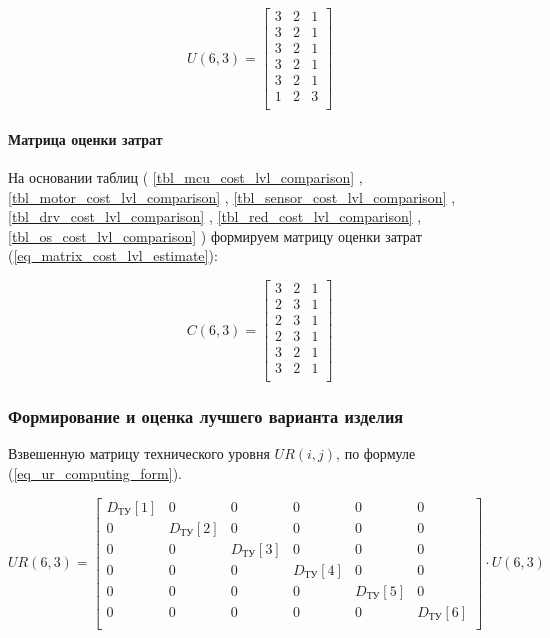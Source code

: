 \begin{equation}
    U(6,3) =
    \begin{bmatrix}
        3 & 2 & 1 \\
        3 & 2 & 1 \\
        3 & 2 & 1 \\
        3 & 2 & 1 \\
        3 & 2 & 1 \\
        1 & 2 & 3 \\
    \end{bmatrix}
    \label{eq_matrix_tech_lvl_estimate}
\end{equation}

\paragraph{Матрица оценки затрат}

На основании таблиц (
    \ref{tbl_mcu_cost_lvl_comparison}
  , \ref{tbl_motor_cost_lvl_comparison}
  , \ref{tbl_sensor_cost_lvl_comparison}
  , \ref{tbl_drv_cost_lvl_comparison}
  , \ref{tbl_red_cost_lvl_comparison}
  , \ref{tbl_os_cost_lvl_comparison}
)
формируем матрицу оценки затрат
(\ref{eq_matrix_cost_lvl_estimate}):

\begin{equation}
    C(6,3) =
    \begin{bmatrix}
        3 & 2 & 1 \\
        2 & 3 & 1 \\
        2 & 3 & 1 \\
        2 & 3 & 1 \\
        3 & 2 & 1 \\
        3 & 2 & 1 \\
    \end{bmatrix}
    \label{eq_matrix_cost_lvl_estimate}
\end{equation}

\subsubsection{Формирование и оценка лучшего варианта изделия}
Взвешенную матрицу технического уровня $UR(i, j)$, по формуле
(\ref{eq_ur_computing_form}).

\begin{equation}
    UR(6,3) =
        \begin{bmatrix}
            D_\text{ТУ}[1] & 0 & 0 & 0 & 0 & 0 \\
            0 & D_\text{ТУ}[2] & 0 & 0 & 0 & 0 \\
            0 & 0 & D_\text{ТУ}[3] & 0 & 0 & 0 \\
            0 & 0 & 0 & D_\text{ТУ}[4] & 0 & 0 \\
            0 & 0 & 0 & 0 & D_\text{ТУ}[5] & 0 \\
            0 & 0 & 0 & 0 & 0 & D_\text{ТУ}[6] \\
        \end{bmatrix}
        \cdot
        U(6,3)
    \label{eq_ur_computing_form}
\end{equation}


